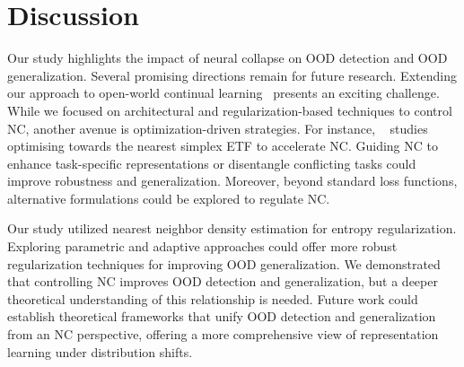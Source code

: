 \section{Discussion}
\label{sec:discussion}


Our study highlights the impact of neural collapse on OOD detection and OOD generalization. Several promising directions remain for future research.  
Extending our approach to open-world continual learning~\cite{kim2025open, dong2024mr} presents an exciting challenge. 
While we focused on architectural and regularization-based techniques to control NC, another avenue is optimization-driven strategies. For instance, ~\citet{markou2024guiding} studies optimising towards the nearest simplex ETF to accelerate NC. 
Guiding NC to enhance task-specific representations or disentangle conflicting tasks could improve robustness and generalization.  
Moreover, beyond standard loss functions, alternative formulations could be explored to regulate NC. 

Our study utilized nearest neighbor density estimation for entropy regularization. Exploring parametric and adaptive approaches could offer more robust regularization techniques for improving OOD generalization.  
We demonstrated that controlling NC improves OOD detection and generalization, but a deeper theoretical understanding of this relationship is needed. Future work could establish theoretical frameworks that unify OOD detection and generalization from an NC perspective, offering a more comprehensive view of representation learning under distribution shifts.  







